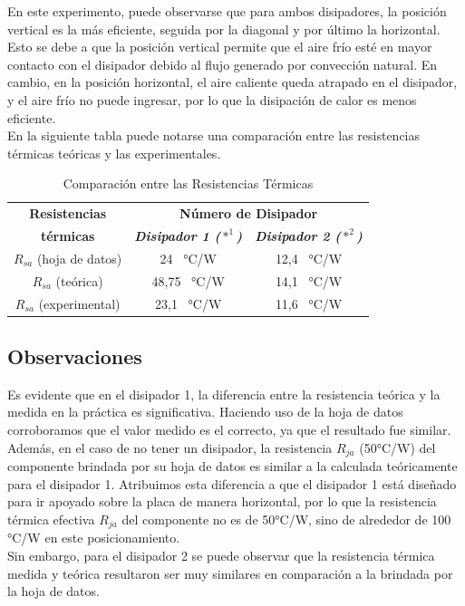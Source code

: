 \documentclass[conference]{IEEEtran}
\begin{document}
    En este experimento, puede observarse que para ambos disipadores, la posición vertical es la más eficiente,
    seguida por la diagonal y por último la horizontal. Esto se debe a que la posición vertical
    permite que el aire frío esté en mayor contacto con el disipador debido al flujo generado por convección natural. 
    En cambio, en la posición horizontal, el aire caliente queda atrapado en el disipador,
    y el aire frío no puede ingresar, por lo que la disipación de calor es menos eficiente.\\

    En la siguiente tabla puede notarse una comparación entre las resistencias térmicas teóricas y las experimentales.
    \begin{table}[htbp]
        \caption{Comparación entre las Resistencias Térmicas}
        \begin{center}
        \begin{tabular}{|c|c|c|}
        \hline
        \textbf{Resistencias} & \multicolumn{2}{c|}{\textbf{Número de Disipador}} \\
        \cline{2-3}
        \textbf{térmicas} & \textbf{\textit{Disipador 1 ($*^1$)}} & \textbf{\textit{Disipador 2 ($*^2$)}} \\
        \hline
        $R_{sa}$ (hoja de datos) & 24 \, \si{\celsius/W} & 12,4 \, \si{\celsius/W} \\
        \hline
        $R_{sa}$ (teórica) & 48,75 \, \si{\celsius/W} & 14,1 \, \si{\celsius/W} \\
        \hline
        $R_{sa}$ (experimental) & 23,1 \, \si{\celsius/W} & 11,6 \, \si{\celsius/W} \\
        \hline
        \end{tabular}
        \label{tab1}
        \end{center}
    \end{table}

    \subsection{Observaciones}
    Es evidente que en el disipador 1, la diferencia entre la resistencia teórica y la medida en la práctica es significativa.
    Haciendo uso de la hoja de datos corroboramos que el valor medido es el correcto, ya que el resultado fue similar.
    Además, en el caso de no tener un disipador, la resistencia $R_{ja}$ (50°C/W) del componente brindada por su hoja de datos
    es similar a la calculada teóricamente para el disipador 1. Atribuimos esta diferencia a que el disipador 1 está diseñado
    para ir apoyado sobre la placa de manera horizontal, por lo que la resistencia térmica efectiva $R_{ja}$ del componente 
    no es de 50°C/W, sino de alrededor de 100 °C/W en este posicionamiento.
    \\
    Sin embargo, para el disipador 2 se puede observar que la resistencia térmica medida y teórica resultaron ser 
    muy similares en comparación a la brindada por la hoja de datos.
\end{document}
